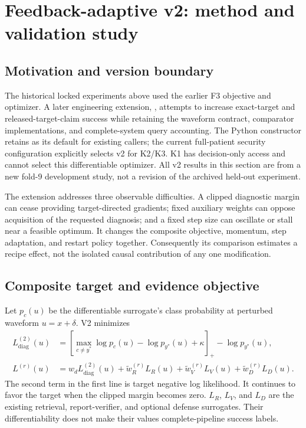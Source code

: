 \section{Feedback-adaptive v2: method and validation study}
\label{sec:adaptivev2}
\subsection{Motivation and version boundary}
The historical locked experiments above used the earlier F3 objective and optimizer. A later engineering extension, , attempts to increase exact-target and released-target-claim success while retaining the waveform contract, comparator implementations, and complete-system query accounting. The Python constructor retains  as its default for existing callers; the current full-patient security configuration explicitly selects v2 for K2/K3. K1 has decision-only access and cannot select this differentiable optimizer. All v2 results in this section are from a new fold-9 development study, not a revision of the archived held-out experiment.

The extension addresses three observable difficulties. A clipped diagnostic margin can cease providing target-directed gradients; fixed auxiliary weights can oppose acquisition of the requested diagnosis; and a fixed step size can oscillate or stall near a feasible optimum. It changes the composite objective, momentum, step adaptation, and restart policy together. Consequently its comparison estimates a recipe effect, not the isolated causal contribution of any one modification.

\subsection{Composite target and evidence objective}
Let $p_c(u)$ be the differentiable surrogate's class probability at perturbed waveform $u=x+\delta$. V2 minimizes
\begin{align}
 L_{\mathrm{diag}}^{(2)}(u)&=
 \left[\max_{c\ne y^*}\log p_c(u)-\log p_{y^*}(u)+\kappa\right]_+
 -\log p_{y^*}(u),\\
 L^{(r)}(u)&=w_dL_{\mathrm{diag}}^{(2)}(u)+
 \widetilde w_R^{(r)}L_R(u)+\widetilde w_V^{(r)}L_V(u)
 +\widetilde w_D^{(r)}L_D(u).
\end{align}
The second term in the first line is target negative log likelihood. It continues to favor the target when the clipped margin becomes zero. $L_R$, $L_V$, and $L_D$ are the existing retrieval, report-verifier, and optional defense surrogates. Their differentiability does not make their values complete-pipeline success labels.

